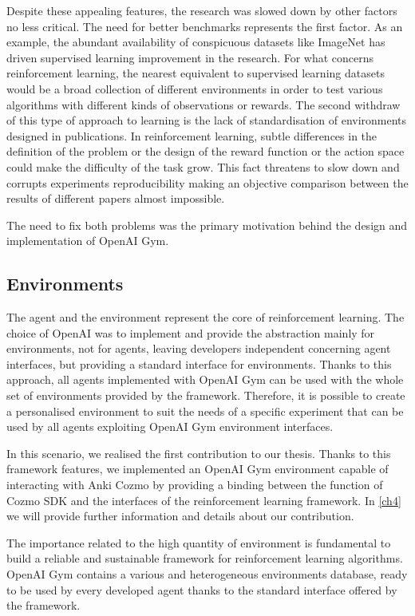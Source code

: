 Despite these appealing features, the research was slowed down by other factors no less critical.
The need for better benchmarks represents the first factor. As an example, the abundant availability of conspicuous datasets like ImageNet \cite{deng2009imagenet} has driven supervised learning improvement in the research. For what concerns reinforcement learning, the nearest equivalent to supervised learning datasets would be a broad collection of different environments in order to test various algorithms with different kinds of observations or rewards.
The second withdraw of this type of approach to learning is the lack of standardisation of environments designed in publications. In reinforcement learning, subtle differences in the definition of the problem or the design of the reward function or the action space could make the difficulty of the task grow.  This fact threatens to slow down and corrupts experiments reproducibility making an objective comparison between the results of different papers almost impossible.

The need to fix both problems was the primary motivation behind the design and implementation of OpenAI Gym.

\subsection{Environments}

The agent and the environment represent the core of reinforcement learning. The choice of OpenAI was to implement and provide the abstraction mainly for environments, not for agents, leaving developers independent concerning agent interfaces, but providing a standard interface for environments. Thanks to this approach, all agents implemented with OpenAI Gym can be used with the whole set of environments provided by the framework. Therefore, it is possible to create a personalised environment to suit the needs of a specific experiment that can be used by all agents exploiting OpenAI Gym environment interfaces.

In this scenario, we realised the first contribution to our thesis. Thanks to this framework features, we implemented an OpenAI Gym environment capable of interacting with Anki Cozmo by providing a binding between the function of Cozmo SDK and the interfaces of the reinforcement learning framework. In \vref{ch4} we will provide further information and details about our contribution.

The importance related to the high quantity of environment is fundamental to build a reliable and sustainable framework for reinforcement learning algorithms. OpenAI Gym contains a various and heterogeneous environments database, ready to be used by every developed agent thanks to the standard interface offered by the framework.

